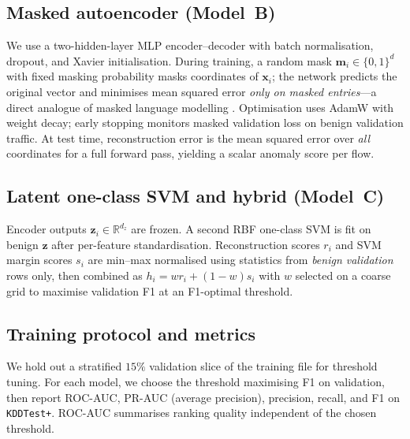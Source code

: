 \documentclass[11pt,a4paper]{article}
\begin{document}
\subsection{Masked autoencoder (Model~B)}
We use a two-hidden-layer MLP encoder--decoder with batch normalisation, dropout, and Xavier initialisation. During training, a random mask $\bm{m}_i \in \{0,1\}^d$ with fixed masking probability masks coordinates of $\bm{x}_i$; the network predicts the original vector and minimises mean squared error \emph{only on masked entries}---a direct analogue of masked language modelling \citep{devlin2019bert,vincent2008extracting}. Optimisation uses AdamW with weight decay; early stopping monitors masked validation loss on benign validation traffic. At test time, reconstruction error is the mean squared error over \emph{all} coordinates for a full forward pass, yielding a scalar anomaly score per flow.

\subsection{Latent one-class SVM and hybrid (Model~C)}
Encoder outputs $\bm{z}_i \in \mathbb{R}^{d_z}$ are frozen. A second RBF one-class SVM is fit on benign $\bm{z}$ after per-feature standardisation. Reconstruction scores $r_i$ and SVM margin scores $s_i$ are min--max normalised using statistics from \emph{benign validation} rows only, then combined as $h_i = w r_i + (1-w)s_i$ with $w$ selected on a coarse grid to maximise validation F1 at an F1-optimal threshold.

\subsection{Training protocol and metrics}
We hold out a stratified $15\%$ validation slice of the training file for threshold tuning. For each model, we choose the threshold maximising F1 on validation, then report ROC-AUC, PR-AUC (average precision), precision, recall, and F1 on \texttt{KDDTest+}. ROC-AUC summarises ranking quality independent of the chosen threshold.
\end{document}
